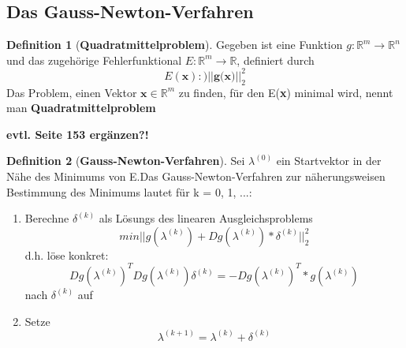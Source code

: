 \documentclass{article}
\theoremstyle{satz}
\theoremstyle{definition}
\newtheorem{definition}{Definition}
\begin{document}
\subsection{Das Gauss-Newton-Verfahren}

\theoremstyle{definition}
\begin{tcolorbox}
\begin{definition}[\textbf{Quadratmittelproblem}]
Gegeben ist eine Funktion $g: \mathbb{R}^m \rightarrow \mathbb{R}^n$ und das zugehörige Fehlerfunktional $E: \mathbb{R}^m \rightarrow \mathbb{R}$, definiert durch 
\begin{equation}
	E(\textbf{x}) :) || \textbf{g(x)} ||^2_2
\end{equation}
Das Problem, einen Vektor $\textbf{x} \in \mathbb{R}^m$ zu finden, für den E(\textbf{x}) minimal wird, nennt man \textbf{Quadratmittelproblem}
\end{definition}
\end{tcolorbox}

\textbf{evtl. Seite 153 ergänzen?!}


\theoremstyle{definition}
\begin{tcolorbox}
\begin{definition}[\textbf{Gauss-Newton-Verfahren}]
Sei $\lambda^{(0)}$ ein Startvektor in der Nähe des Minimums von E.Das Gauss-Newton-Verfahren zur näherungsweisen Bestimmung des Minimums lautet für k = 0, 1, ...:
\begin{enumerate}
	\item {Berechne $\delta^{(k)}$ als Lösungs des linearen Ausgleichsproblems
		\begin{equation}
		min || g(\lambda^{(k)}) + Dg(\lambda^{(k)})*\delta^{(k)}||^2_2
		\end{equation}			
	d.h. löse konkret:
		\begin{equation}
		Dg(\lambda^{(k)})^T Dg(\lambda^{(k)}) \delta^{(k)} = -Dg(\lambda^{(k)})^T*g(\lambda^{(k)})
		\end{equation}
		nach $\delta^{(k)}$ auf
	}
	\item {Setze
	\begin{equation}
	\lambda^{(k+1)} = \lambda^{(k)} + \delta^{(k)}
	\end{equation}
	}
\end{enumerate}
\end{definition}
\end{tcolorbox}
\end{document}
